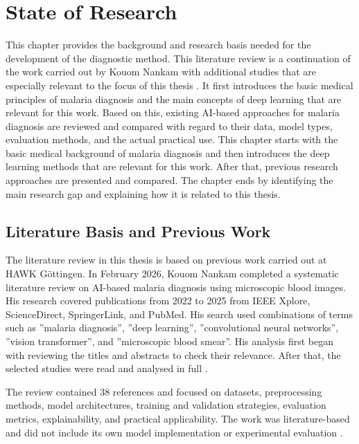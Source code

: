 \chapter{State of Research}
\label{chap:state-of-research}

This chapter provides the background and research basis needed for the development of the diagnostic method. This literature review is a continuation of the work carried out by Kouom Nankam with additional studies that are especially relevant to the focus of this thesis \cite{Kouom2026}. It first introduces the basic medical principles of malaria diagnosis and the main concepts of deep learning that are relevant for this work. Based on this, existing AI-based approaches for malaria diagnosis are reviewed and compared with regard to their data, model types, evaluation methods, and the actual practical use. This chapter starts with the basic medical background of malaria diagnosis and then introduces the deep learning methods that are relevant for this work. After that, previous research approaches are presented and compared. The chapter ends by identifying the main research gap and explaining how it is related to this thesis.

\section{Literature Basis and Previous Work}
\label{sec:literature_basis}

The literature review in this thesis is based on previous work carried out at HAWK Göttingen. In February 2026, Kouom Nankam completed a systematic literature review on AI-based malaria diagnosis using microscopic blood images. His research covered publications from 2022 to 2025 from IEEE Xplore, ScienceDirect, SpringerLink, and PubMed. His search used combinations of terms such as ''malaria diagnosis'', ''deep learning'', ''convolutional neural networks'', ''vision transformer'', and ''microscopic blood smear''. His analysis first began with reviewing the titles and abstracts to check their relevance. After that, the selected studies were read and analysed in full \cite{Kouom2026}.

The review contained 38 references and focused on datasets, preprocessing methods, model architectures, training and validation strategies, evaluation metrics, explainability, and practical applicability. The work was literature-based and did not include its own model implementation or experimental evaluation \cite{Kouom2026}.


